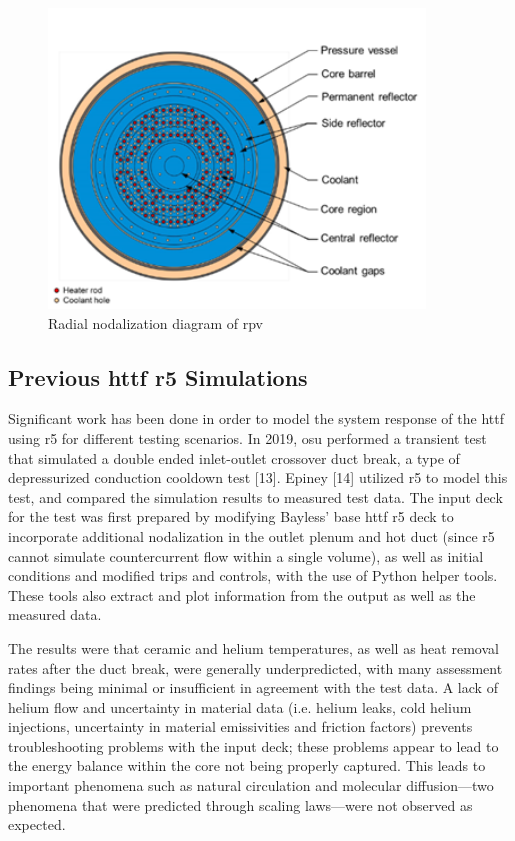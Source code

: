 \documentclass[double,12pt]{beavtex}
\begin{document}
\begin{figure}
    \begin{center}
    	\includegraphics[width=10cm]{Figures/HTTF_RELAP_RPV_Nodalization_Radial.png}
    	\caption{Radial nodalization diagram of \acrshort{rpv}}
    	\label{fig:HTTF_RELAP_RPV_Nodalization_Radial}
    	\end{center}
\end{figure}

\subsection{Previous \acrshort{httf} \acrshort{r5} Simulations}

Significant work has been done in order to model the system response of the \acrshort{httf} using \acrshort{r5} for different testing scenarios. In 2019, \acrshort{osu} performed a transient test that simulated a double ended inlet-outlet crossover duct break, a type of depressurized conduction cooldown test [13]. Epiney [14] utilized \acrshort{r5} to model this test, and compared the simulation results to measured test data. The input deck for the test was first prepared by modifying Bayless’ base \acrshort{httf} \acrshort{r5} deck to incorporate additional nodalization in the outlet plenum and hot duct (since \acrshort{r5} cannot simulate countercurrent flow within a single volume), as well as initial conditions and modified trips and controls, with the use of Python helper tools. These tools also extract and plot information from the output as well as the measured data. 

The results were that ceramic and helium temperatures, as well as heat removal rates after the duct break, were generally underpredicted, with many assessment findings being minimal or insufficient in agreement with the test data. A lack of helium flow and uncertainty in material data (i.e. helium leaks, cold helium injections, uncertainty in material emissivities and friction factors) prevents troubleshooting problems with the input deck; these problems appear to lead to the energy balance within the core not being properly captured. This leads to important phenomena such as natural circulation and molecular diffusion—two phenomena that were predicted through scaling laws—were not observed as expected.
\end{document}
